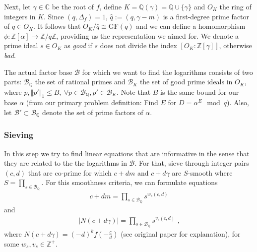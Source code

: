 \documentclass[paper=a4, fontsize=11pt]{scrartcl} %
\numberwithin{equation}{section} %
\numberwithin{figure}{section} %
\numberwithin{table}{section} %
\begin{document}
Next, let $\gamma\in\mathbb{C}$ be the root of $f$, define $K = \mathbb{Q}(\gamma) = \mathbb{Q}\cup\{\gamma\}$ and $O_K$ the ring of integers in $K$. Since $(q,\Delta_f) = 1$, $\hat{q}:=(q,\gamma-m)$ is a first-degree prime factor of $q\in O_K$. It follows that $O_K/\hat{q}\cong\mathrm{GF}(q)$ and we can define a homomorphism $\phi:\mathbb{Z}[\alpha]\rightarrow\mathbb{Z}/q\mathbb{Z}$, providing us the representation we aimed for. We denote a prime ideal $s\in O_K$ as \textit{good} if $s$ does not divide the index $[O_K:\mathbb{Z}[\gamma]]$, otherwise \textit{bad}.

The actual factor base $\mathcal{B}$ for which we want to find the logarithms consists of two parts: $\mathcal{B}_\mathbb{Q}$ the set of rational primes and $\mathcal{B}_K$ the set of good prime ideals in $O_K$, where $p,\Vert p'\Vert_1\leq B,\ \forall p\in\mathcal{B}_\mathbb{Q},p'\in\mathcal{B}_K$. Note that $B$ is the same bound for our base $\alpha$ (from our primary problem definition: Find $E$ for $D=\alpha^E\mod q$). Also, let $\mathcal{B}'\subset\mathcal{B}_\mathbb{Q}$ denote the set of prime factors of $\alpha$.

\subsubsection{Sieving}
In this step we try to find linear equations that are informative in the sense that they are related to the the logarithms in $\mathcal{B}$. For that, sieve through integer pairs $(c,d)$ that are co-prime for which $c+dm$ and $c+d\gamma$ are $S$-smooth where $S = \prod_{s\in\mathcal{B}_\mathbb{Q}}$. For this smoothness criteria, we can formulate equations
\begin{eqnarray}
c+dm = \prod_{s\in\mathcal{B}_\mathbb{Q}}s^{w_s(c,d)}
\end{eqnarray}
and
\begin{eqnarray}
|N(c+d\gamma)| = \prod_{s\in\mathcal{B}_\mathbb{Q}}s^{v_s(c,d)}
\text{ ,}
\end{eqnarray}
where $N(c+d\gamma) = (-d)^kf(-\frac{c}{d})$ (see original paper \citep{gordon1993discrete} for explanation), for some $w_s,v_s\in\mathbb{Z}^+$.
\end{document}
